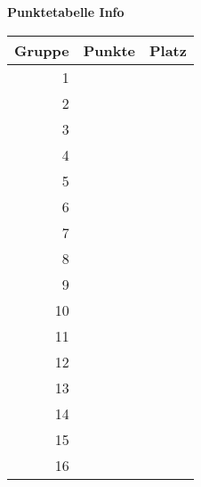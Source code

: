\documentclass[a4paper,10pt]{article}
\begin{document}
\begin{center}
 {\Huge \textbf{Punktetabelle Info}} \vspace{2cm} \\
 \LARGE
 \begin{tabular}{|r|l|l|}
  \hline
  Gruppe & Punkte & Platz  \\ \hline
  1 &\hspace{5cm} & \hspace{3cm}\\ \hline 
  2 &\hspace{5cm} & \hspace{3cm}\\ \hline
  3 &\hspace{5cm} & \hspace{3cm}\\ \hline
  4 &\hspace{5cm} & \hspace{3cm}\\ \hline
  5 &\hspace{5cm} & \hspace{3cm}\\ \hline
  6 &\hspace{5cm} & \hspace{3cm}\\ \hline
  7 &\hspace{5cm} & \hspace{3cm}\\ \hline
  8 &\hspace{5cm} & \hspace{3cm}\\ \hline
  9 &\hspace{5cm} & \hspace{3cm}\\ \hline 
  10 &\hspace{5cm} & \hspace{3cm}\\ \hline
  11 &\hspace{5cm} & \hspace{3cm}\\ \hline
  12 &\hspace{5cm} & \hspace{3cm}\\ \hline
  13 &\hspace{5cm} & \hspace{3cm}\\ \hline
  14 &\hspace{5cm} & \hspace{3cm}\\ \hline
  15 &\hspace{5cm} & \hspace{3cm}\\ \hline
  16 &\hspace{5cm} & \hspace{3cm}\\ \hline
 \end{tabular}

\end{center}
\end{document}
